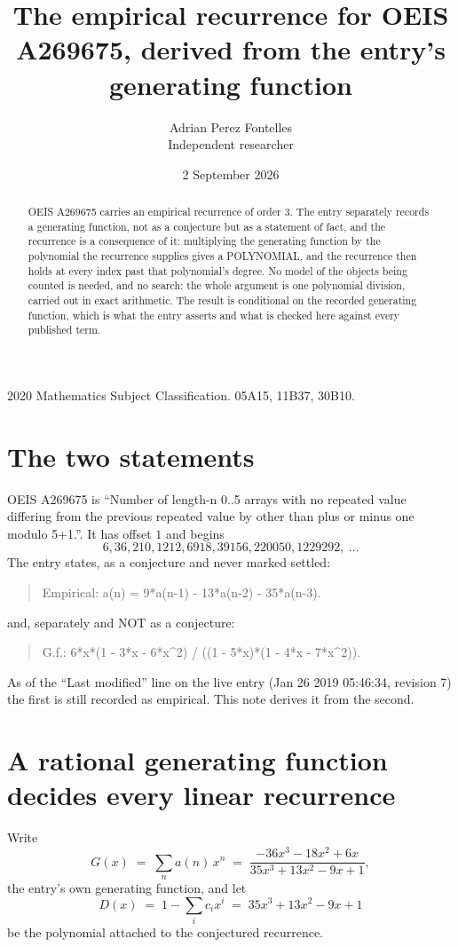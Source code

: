\documentclass[11pt,a4paper]{article}
\title{The empirical recurrence for OEIS A269675, derived from the entry's generating function}
\author{Adrian Perez Fontelles\\ \small Independent researcher}
\date{2 September 2026}
\theoremstyle{plain}
\theoremstyle{definition}
\begin{document}
\maketitle

\begin{abstract}
OEIS A269675 carries an empirical recurrence of order $3$. The entry separately records a
generating function, not as a conjecture but as a statement of fact, and the recurrence is a
consequence of it: multiplying the generating function by the polynomial the recurrence
supplies gives a POLYNOMIAL, and the recurrence then holds at every index past that
polynomial's degree. No model of the objects being counted is needed, and no search: the
whole argument is one polynomial division, carried out in exact arithmetic. The result is
conditional on the recorded generating function, which is what the entry asserts and what is
checked here against every published term.
\end{abstract}

\noindent\small 2020 Mathematics Subject Classification. 05A15, 11B37, 30B10.\normalsize

\section{The two statements}

OEIS A269675 is ``Number of length-n 0..5 arrays with no repeated value differing from the previous repeated value by other than plus or minus one modulo 5+1.''. It has offset $1$ and begins
\[
6, 36, 210, 1212, 6918, 39156, 220050, 1229292,\ \dots
\]
The entry states, as a conjecture and never marked settled:
\begin{quote}
Empirical: a(n) = 9*a(n-1) - 13*a(n-2) - 35*a(n-3).
\end{quote}
and, separately and NOT as a conjecture:
\begin{quote}
G.f.: 6*x*(1 - 3*x - 6*x\^{}2) / ((1 - 5*x)*(1 - 4*x - 7*x\^{}2)).
\end{quote}
As of the ``Last modified'' line on the live entry (Jan 26 2019 05:46:34, revision 7) the first is still
recorded as empirical. This note derives it from the second.

\section{A rational generating function decides every linear recurrence}

Write
\[
G(x)\;=\;\sum_{n}a(n)\,x^{n}\;=\;\frac{- 36 x^{3} - 18 x^{2} + 6 x}{35 x^{3} + 13 x^{2} - 9 x + 1},
\]
the entry's own generating function, and let
\[
D(x)\;=\;1-\sum_i c_i x^{i}\;=\;35 x^{3} + 13 x^{2} - 9 x + 1
\]
be the polynomial attached to the conjectured recurrence.
\end{document}
